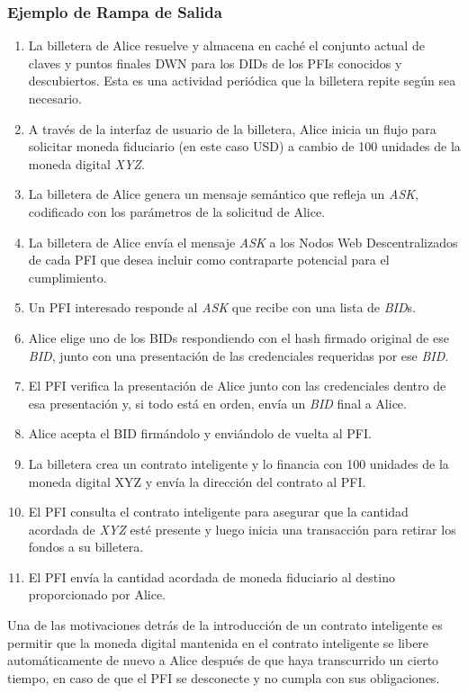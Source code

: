 \documentclass[11pt]{article}
\begin{document}
\subsubsection{Ejemplo de Rampa de Salida}

\begin{enumerate}
	\item La billetera de Alice resuelve y almacena en caché el conjunto actual de claves y puntos finales DWN para los DIDs de los PFIs conocidos y descubiertos. Esta es una actividad periódica que la billetera repite según sea necesario.

	\item A través de la interfaz de usuario de la billetera, Alice inicia un flujo para solicitar moneda fiduciario (en este caso USD) a cambio de 100 unidades de la moneda digital \textit{XYZ}.

	\item La billetera de Alice genera un mensaje semántico que refleja un \textit{ASK}, codificado con los parámetros de la solicitud de Alice.  

	\item La billetera de Alice envía el mensaje \textit{ASK} a los Nodos Web Descentralizados de cada PFI que desea incluir como contraparte potencial para el cumplimiento.

	\item Un PFI interesado responde al \textit{ASK} que recibe con una lista de \textit{BID}s. 

	\item Alice elige uno de los BIDs respondiendo con el hash firmado original de ese \textit{BID}, junto con una presentación de las credenciales requeridas por ese \textit{BID}. 

	\item El PFI verifica la presentación de Alice junto con las credenciales dentro de esa presentación y, si todo está en orden, envía un \textit{BID} final a Alice.

	\item Alice acepta el BID firmándolo y enviándolo de vuelta al PFI.

	\item La billetera crea un contrato inteligente y lo financia con 100 unidades de la moneda digital XYZ y envía la dirección del contrato al PFI.

	\item El PFI consulta el contrato inteligente para asegurar que la cantidad acordada de \textit{XYZ} esté presente y luego inicia una transacción para retirar los fondos a su billetera.

	\item El PFI envía la cantidad acordada de moneda fiduciario al destino proporcionado por Alice.

\vspace{1\baselineskip}
\end{enumerate}
Una de las motivaciones detrás de la introducción de un contrato inteligente es permitir que la moneda digital mantenida en el contrato inteligente se libere automáticamente de nuevo a Alice después de que haya transcurrido un cierto tiempo, en caso de que el PFI se desconecte y no cumpla con sus obligaciones.
\end{document}
